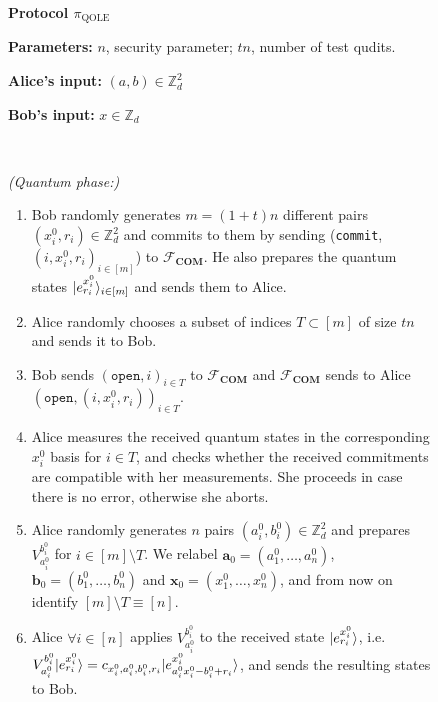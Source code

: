 \begin{figure}[h!]
    \centering
        \begin{tcolorbox}
            
            \centerline{\textbf{Protocol $\mathcal{\pi}_{\text{QOLE}}$}}
            
    \footnotesize
    
    \textbf{Parameters:} $n$, security parameter; $tn$, number of test qudits.
    
    \textbf{Alice's input:} $(a, b)\in\mathbb{Z}_d^2$ 
    
    \textbf{Bob's input:} $x\in\mathbb{Z}_d$

\

    \textit{(Quantum phase:)}
    
    \begin{enumerate}
        \item Bob randomly generates $m = (1+t)n$ different pairs $(x^0_i, r_i)\in\mathbb{Z}_d^2$ and commits to them by sending (\texttt{commit}, $(i,x^0_i, r_i)_{ i\in [m]}$) to  $\mathcal{F}_{\textbf{COM}}$. He also prepares the quantum states $| e^{x^0_i}_{r_i} \rangle_{ i\in [m]}$ and sends them to Alice. 
        
        \item Alice randomly chooses a subset of indices $T\subset [m]$ of size $t n$ and sends it to Bob.
    
        \item Bob sends $(\texttt{open}, i)_{ i\in T}$ to $\mathcal{F}_{\textbf{COM}}$ and $\mathcal{F}_{\textbf{COM}}$ sends to Alice $(\texttt{open}, (i, x^0_i, r_i))_{ i\in T}$.
    
        \item Alice measures the received quantum states in the corresponding $x^0_i$ basis for $i\in T$, and checks whether the received commitments are compatible with her measurements. She proceeds in case there is no error, otherwise she aborts.
    
        \item Alice randomly generates $n$ pairs $(a^0_i, b^0_i)\in\mathbb{Z}_d^2$ and prepares  $V^{b^0_i}_{a^0_i}$ for $i\in [m]\setminus T$. We relabel $\bm{a}_0 = (a^0_1, \ldots, a^0_n)$, $\bm{b}_0 = (b^0_1, \ldots, b^0_n)$ and $\bm{x}_0 = (x^0_1, \ldots, x^0_n)$, and from now on identify $[m]\setminus T\equiv [n]$.
    
        \item Alice  $\forall i\in [n]$ applies $V^{b^0_i}_{a^0_i}$ to the received state $| e^{x^0_i}_{r_i} \rangle$, i.e. $V^{b^0_i}_{a^0_i} | e^{x^0_i}_{r_i} \rangle = c_{x^0_i,a^0_i,b^0_i,r_i} | e^{x^0_i}_{a^0_i x^0_i - b^0_i + r_i} \rangle$, and sends the resulting states to Bob.
    

\end{enumerate}
\end{tcolorbox}
\end{figure}
